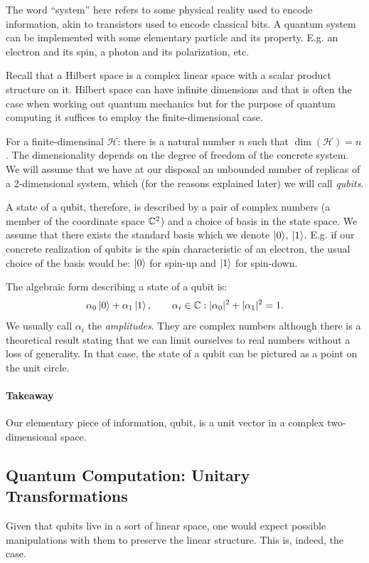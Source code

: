 \documentclass{article}
\begin{document}
The word ``system'' here refers to some physical reality used to encode information,
akin to transistors used to encode classical bits. A quantum system can be implemented
with some elementary particle and its property. E.g. an electron and its spin, a photon
and its polarization, etc.

Recall that a Hilbert space is a complex linear space with a scalar product structure
on it. Hilbert space can have infinite dimensions and that is often the case when
working out quantum mechanics but for the purpose of quantum computing it suffices to
employ the finite-dimensional case.

For a finite-dimensinal $\mathcal H$: there is a natural number $n$ such that 
$\dim(\mathcal H) =n$. The dimensionality depends on the degree of freedom of 
the concrete system. We will assume that we have
at our disposal an unbounded number of replicas of a 2-dimensional system, which 
(for the reasons explained later) we will call \textit{qubits}.

A state of a qubit, therefore, is described by a pair of complex numbers (a member 
of the coordinate space $\mathbb C^2$) and a choice of
basis in the state space. We assume that there exists the standard basis which we denote
$\ket 0$, $\ket 1$. E.g. if our concrete realization of qubits is the spin characteristic
of an electron, the usual choice of the basis would be: $\ket 0$ for spin-up
and $\ket 1$ for spin-down. 

The algebraic form describing a state of a qubit is:
\[
  \alpha_0 \ket 0 + \alpha_1 \ket 1, \qquad \alpha_i \in \mathbb C: |\alpha_0|^2 + |\alpha_1|^2 = 1.
\]
We usually call $\alpha_i$ the \textit{amplitudes}. They are complex numbers although
there is a theoretical result stating that we can limit ourselves to real numbers without
a loss of generality. In that case, the state of a qubit can be pictured as a
point on the unit circle.

\paragraph{Takeaway} Our elementary piece of information, qubit, is a unit vector
in a complex two-dimensional space.

\subsection{Quantum Computation: Unitary Transformations}

Given that qubits live in a sort of linear space, one would expect possible
manipulations with them to preserve the linear structure. This is, indeed, 
the case.
\end{document}
